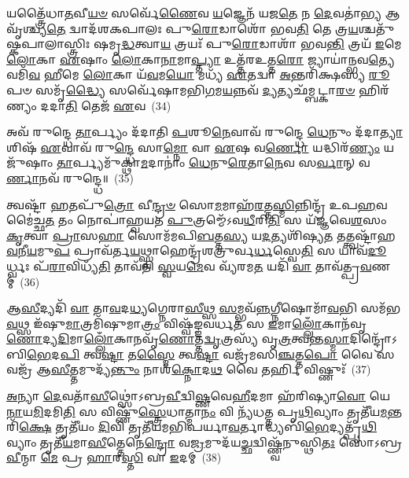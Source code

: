 𑌯𑌤𑍍𑌤𑍍𑌰𑍈᳴𑌧𑌾\-\ul{𑌤}\-𑌵𑍀\-\ul{𑌯}\-\-\ul{𑍞} 𑌸𑌰𑍍𑌵𑍇᳴\-\ul{𑌣𑍈}\-𑌵 \ul{𑌯}\-𑌜𑍍𑌞𑍇𑌨᳴ 𑌯𑌜\-\ul{𑌤𑍇} 𑌨 \ul{𑌦𑍇}\-𑌵𑌤𑌾॑\-\ul{𑌭𑍍𑌯} 𑌆 𑌵𑍃᳴𑌶𑍍𑌚𑍍𑌯\-\ul{𑌤𑍇} 𑌦𑍍𑌵𑌾𑌦᳴𑌶\-𑌕𑌪𑌾𑌲𑌃 𑌪𑍁\-\ul{𑌰𑍋}\-𑌡𑌾𑌶𑍋᳴ 𑌭𑌵\-\ul{𑌤𑌿} 𑌤𑍇 𑌤𑍍𑌰\-\ul{𑌯}\-𑌶𑍍𑌚𑌤𑍁᳴𑌷𑍍𑌕𑌪𑌾𑌲𑌾𑌸𑍍𑌤𑍍𑌰𑌿𑌃 𑌷𑌮𑍃\-\ul{𑌦𑍍𑌧}\-𑌤𑍍𑌵𑌾\-\ul{𑌯} 𑌤𑍍𑌰𑌯𑌃᳴ 𑌪𑍁\-\ul{𑌰𑍋}\-𑌡𑌾𑌶𑌾᳴ 𑌭𑌵\-\ul{𑌨𑍍𑌤𑌿} 𑌤𑍍𑌰𑌯᳴ \ul{𑌇}\-𑌮𑍇 \ul{𑌲𑍋}\-𑌕𑌾 \ul{𑌏}\-𑌷𑌾𑌂 \ul{𑌲𑍋}\-𑌕𑌾\-\ul{𑌨𑌾}\-𑌮𑌾\-\ul{𑌪𑍍𑌤𑍍𑌯𑌾} 𑌉𑌤𑍍𑌤᳴𑌰𑌉𑌤𑍍𑌤\-\ul{𑌰𑍋} 𑌜𑍍𑌯𑌾𑌯𑌾॑𑌨𑍍𑌭𑌵\-\ul{𑌤𑍍𑌯𑍇}\-𑌵𑌮𑌿᳴\-\ul{𑌵} 𑌹𑍀𑌮𑍇 \ul{𑌲𑍋}\-𑌕𑌾 𑌯᳴\-\ul{𑌵}\-𑌮\-\ul{𑌯𑍋} 𑌮𑌧𑍍𑌯᳴ \ul{𑌏}\-𑌤𑌦𑍍𑌵𑌾 \ul{𑌅}\-𑌨𑍍𑌤𑌰𑌿᳴𑌕𑍍𑌷𑌸𑍍𑌯 \ul{𑌰𑍂}\-𑌪𑍞 𑌸𑌮𑍃᳴\-\ul{𑌦𑍍𑌧𑍍𑌯𑍈} 𑌸𑌰𑍍𑌵𑍇᳴𑌷𑌾𑌮𑌭𑌿\-\ul{𑌗}\-𑌮\-\ul{𑌯}\-𑌨𑍍𑌨𑌵᳴ \ul{𑌦𑍍𑌯}\-𑌤𑍍𑌯𑌛᳴𑌮𑍍𑌬𑌟𑍍𑌕𑌾\-\ul{𑌰}\-\-\ul{𑍞} 𑌹𑌿𑌰᳴𑌣𑍍𑌯𑌂 𑌦𑌦𑌾\-\ul{𑌤𑌿} 𑌤𑍇𑌜᳴ \ul{𑌏}\-𑌵~(34)

𑌅𑌵᳴ 𑌰𑍁𑌨𑍍𑌦𑍍𑌧𑍇 \ul{𑌤𑌾}\-𑌰𑍍𑌪𑍍𑌯𑌂 𑌦᳴𑌦𑌾𑌤𑌿 \ul{𑌪}\-𑌶𑍂\-\ul{𑌨𑍇}\-𑌵𑌾𑌵᳴ 𑌰𑍁𑌨𑍍𑌦𑍍𑌧𑍇 \ul{𑌧𑍇}\-𑌨𑍁𑌂 𑌦᳴𑌦𑌾\-\ul{𑌤𑍍𑌯𑌾}\-𑌶𑌿𑌷᳴ \ul{𑌏}\-𑌵𑌾𑌵᳴ 𑌰𑍁\-\ul{𑌨𑍍𑌦𑍍𑌧𑍇} 𑌸𑌾\-\ul{𑌮𑍍𑌨𑍋} 𑌵𑌾 \ul{𑌏}\-𑌷 𑌵\-\ul{𑌰𑍍𑌣𑍋} 𑌯𑌦𑍍𑌧𑌿𑌰᳴\-\ul{𑌣𑍍𑌯𑌂} 𑌯𑌜𑍁᳴𑌷𑌾𑌂 \ul{𑌤𑌾}\-𑌰𑍍𑌪𑍍𑌯𑌮𑍁᳴𑌕𑍍𑌥𑌾\-\ul{𑌮}\-𑌦𑌾𑌨𑌾𑌂॑ \ul{𑌧𑍇}\-𑌨𑍁\-\ul{𑌰𑍇}\-𑌤𑌾\-\ul{𑌨𑍇}\-𑌵 𑌸\-\ul{𑌰𑍍𑌵𑌾}\-𑌨𑍍 𑌵\-\ul{𑌰𑍍𑌣𑌾}\-𑌨𑌵᳴ 𑌰𑍁𑌨𑍍𑌦𑍍𑌧𑍇॥~(35)

{\anuvakamend[{𑌜𑌗᳴𑌤𑍍𑌯𑌾\-𑌽\-\ul{𑌭𑌿}\-𑌚\-\ul{𑌰}\-𑌨𑍍𑌥𑍍𑌸\-\ul{𑌰𑍍𑌵𑍋} 𑌵𑍈 𑌗᳴𑌚𑍍𑌛𑌤𑌿 \ul{𑌯}\-𑌜𑍍𑌞𑌸𑍍𑌤𑍇𑌜᳴ \ul{𑌏}\-𑌵 \ul{𑌤𑍍𑌰𑌿}\-\-\ul{𑍞}\-𑌶𑌚𑍍𑌚᳴}]}%

𑌤𑍍𑌵𑌷𑍍𑌟𑌾᳴ \ul{𑌹}\-𑌤𑌪𑍁᳴\-\ul{𑌤𑍍𑌰𑍋} 𑌵𑍀\-\ul{𑌨𑍍𑌦𑍍𑌰}\-\-\ul{𑍞} 𑌸𑍋\-\ul{𑌮}\-𑌮𑌾𑌹᳴\-\ul{𑌰}\-𑌤𑍍𑌤\-\ul{𑌸𑍍𑌮𑌿}\-𑌨𑍍𑌨𑌿𑌨𑍍𑌦𑍍𑌰᳴ 𑌉𑌪\-\ul{𑌹}\-𑌵𑌮𑍈॑𑌚𑍍𑌛\-\ul{𑌤} 𑌤𑌂 𑌨𑍋𑌪𑌾॑𑌹𑍍𑌵𑌯𑌤 \ul{𑌪𑍁}\-𑌤𑍍𑌰𑌮𑍍𑌮𑍇᳴\-𑌽𑌵\-\ul{𑌧𑍀}\-𑌰𑌿\-\ul{𑌤𑌿} 𑌸 𑌯᳴𑌜𑍍𑌞𑌵𑍇\-\ul{𑌶}\-𑌸𑌂 \ul{𑌕𑍃}\-𑌤𑍍𑌵𑌾 \ul{𑌪𑍍𑌰𑌾}\-𑌸\-\ul{𑌹𑌾} 𑌸𑍋𑌮᳴𑌮𑌪𑌿\-\ul{𑌬}\-𑌤𑍍𑌤\-\ul{𑌸𑍍𑌯} 𑌯\-\ul{𑌦}\-𑌤𑍍𑌯𑌶𑌿᳴𑌷𑍍𑌯\-\ul{𑌤} 𑌤𑌤𑍍𑌤𑍍𑌵𑌷𑍍𑌟𑌾᳴𑌹\-\ul{𑌵}\-𑌨𑍀\-\ul{𑌯}\-𑌮𑍁\-\ul{𑌪} 𑌪𑍍𑌰𑌾𑌵᳴𑌰𑍍𑌤\-\ul{𑌯}\-𑌥𑍍𑌸𑍍𑌵𑌾𑌹𑍇𑌨𑍍𑌦𑍍𑌰᳴𑌶𑌤𑍍𑌰𑍁𑌰𑍍𑌵\-\ul{𑌰𑍍𑌧}\-𑌸𑍍𑌵𑍇\-\ul{𑌤𑌿} 𑌸 𑌯𑌾𑌵᳴\-\ul{𑌦𑍂}\-𑌰𑍍𑌧𑍍𑌵𑌃 𑌪᳴\-\ul{𑌰𑌾}\-𑌵𑌿𑌧𑍍𑌯᳴\-\ul{𑌤𑌿} 𑌤𑌾𑌵᳴𑌤𑌿 \ul{𑌸𑍍𑌵}\-𑌯\-\ul{𑌮𑍇}\-𑌵 𑌵𑍍𑌯᳴𑌰𑌮\-\ul{𑌤} 𑌯𑌦𑌿᳴ \ul{𑌵𑌾} 𑌤𑌾𑌵᳴𑌤𑍍𑌪𑍍𑌰\-\ul{𑌵}\-𑌣𑌮𑍍~(36)

𑌆\-\ul{𑌸𑍀}\-𑌦𑍍𑌯𑌦𑌿᳴ \ul{𑌵𑌾} 𑌤𑌾\-\ul{𑌵}\-𑌦\-\ul{𑌧𑍍𑌯}\-𑌗𑍍𑌨𑍇𑌰𑌾\-\ul{𑌸𑍀}\-𑌥𑍍𑌸 \ul{𑌸}\-𑌮𑍍𑌭𑌵᳴\-\ul{𑌨𑍍𑌨}\-𑌗𑍍𑌨𑍀𑌷𑍋𑌮𑌾᳴\-\ul{𑌵}\-𑌭𑌿 𑌸𑌮᳴𑌭\-\ul{𑌵}\-𑌥𑍍𑌸 𑌇᳴𑌷𑍁\-\ul{𑌮𑌾}\-𑌤𑍍𑌰𑌮𑌿᳴𑌷𑍁𑌮𑌾\-\ul{𑌤𑍍𑌰𑌂} 𑌵𑌿𑌷𑍍𑌵᳴𑌙𑍍𑌙𑌵𑌰𑍍𑌧\-\ul{𑌤} 𑌸 \ul{𑌇}\-𑌮𑌾\-\ul{𑌲𑍍𑌲𑍋𑌁}\-𑌕𑌾𑌨᳴𑌵𑍃\-\ul{𑌣𑍋}\-𑌦𑍍𑌯\-\ul{𑌦𑌿}\-𑌮𑌾\-\ul{𑌲𑍍𑌲𑍋𑌁}\-𑌕𑌾𑌨𑌵𑍃᳴\-\ul{𑌣𑍋}\-𑌤𑍍𑌤\-\ul{𑌦𑍍𑌵𑍃}\-𑌤𑍍𑌰𑌸𑍍𑌯᳴ 𑌵𑍃\-\ul{𑌤𑍍𑌰}\-𑌤𑍍𑌵𑌨𑍍𑌤\-\ul{𑌸𑍍𑌮𑌾}\-𑌦𑌿𑌨𑍍𑌦𑍍𑌰𑍋᳴\-𑌽𑌬𑌿\-\ul{𑌭𑍇}\-𑌦\-\ul{𑌪𑌿} 𑌤𑍍𑌵\-\ul{𑌷𑍍𑌟𑌾} 𑌤\-\ul{𑌸𑍍𑌮𑍈} 𑌤𑍍𑌵\-\ul{𑌷𑍍𑌟𑌾} 𑌵𑌜𑍍𑌰᳴𑌮𑌸𑌿\-\ul{𑌞𑍍𑌚}\-𑌤𑍍𑌤\-\ul{𑌪𑍋} 𑌵𑍈 𑌸 𑌵𑌜𑍍𑌰᳴ 𑌆\-\ul{𑌸𑍀}\-𑌤𑍍𑌤𑌮𑍁𑌦𑍍𑌯᳴\-\ul{𑌨𑍍𑌤𑍁𑌂} 𑌨𑌾𑌶᳴\-\ul{𑌕𑍍𑌨𑍋}\-𑌦\-\ul{𑌥} 𑌵𑍈 𑌤𑌰𑍍\mbox{}\-\ul{𑌹𑌿} 𑌵𑌿𑌷𑍍𑌣𑍁𑌃᳴~(37)

\-\ul{𑌅}\-𑌨𑍍𑌯𑌾 \ul{𑌦𑍇}\-𑌵𑌤𑌾᳴\-\ul{𑌸𑍀}\-𑌥𑍍𑌸𑍋॑\-𑌽𑌬𑍍𑌰\-\ul{𑌵𑍀}\-𑌦𑍍𑌵𑌿\-\ul{𑌷𑍍𑌣}\-𑌵𑍇\-\ul{𑌹𑍀}\-𑌦𑌮𑌾 𑌹᳴𑌰𑌿𑌷𑍍𑌯𑌾\-\ul{𑌵𑍋} 𑌯𑍇\-\ul{𑌨𑌾}\-𑌯\-\ul{𑌮𑌿}\-𑌦𑌮𑌿\-\ul{𑌤𑌿} 𑌸 𑌵𑌿𑌷𑍍𑌣𑍁᳴\-\ul{𑌸𑍍𑌤𑍍𑌰𑍇}\-𑌧𑌾𑌤𑍍𑌮𑌾\-\ul{𑌨𑌂} 𑌵𑌿 𑌨𑍍𑌯᳴𑌧𑌤𑍍𑌤 𑌪𑍃\-\ul{𑌥𑌿}\-𑌵𑍍𑌯𑌾𑌂 𑌤𑍃𑌤𑍀᳴𑌯\-\ul{𑌮}\-𑌨𑍍𑌤𑌰𑌿᳴\-\ul{𑌕𑍍𑌷𑍇} 𑌤𑍃𑌤𑍀᳴𑌯𑌂 \ul{𑌦𑌿}\-𑌵𑌿 𑌤𑍃𑌤𑍀᳴𑌯𑌮𑌭𑌿𑌪𑌰𑍍𑌯𑌾\-\ul{𑌵}\-𑌰𑍍𑌤𑌾𑌦𑍍𑌧𑍍𑌯𑌬𑌿᳴\-\ul{𑌭𑍇}\-𑌦𑍍𑌯𑌤𑍍𑌪𑍃᳴\-\ul{𑌥𑌿}\-𑌵𑍍𑌯𑌾𑌂 𑌤𑍃𑌤𑍀᳴\-\ul{𑌯}\-𑌮𑌾\-\ul{𑌸𑍀}\-𑌤𑍍𑌤𑍇𑌨𑍇\-\ul{𑌨𑍍𑌦𑍍𑌰𑍋} 𑌵\-\ul{𑌜𑍍𑌰}\-𑌮𑍁𑌦᳴𑌯\-\ul{𑌚𑍍𑌛}\-𑌦𑍍𑌵𑌿𑌷𑍍𑌣𑍍𑌵᳴𑌨𑍁𑌸𑍍𑌥𑌿\-\ul{𑌤𑌃} 𑌸𑍋॑\-𑌽𑌬𑍍𑌰\-\ul{𑌵𑍀}\-𑌨𑍍𑌮𑌾 \ul{𑌮𑍇} 𑌪𑍍𑌰 \ul{𑌹𑌾}\-𑌰\-\ul{𑌸𑍍𑌤𑌿} 𑌵𑌾 \ul{𑌇}\-𑌦𑌮𑍍~(38)

